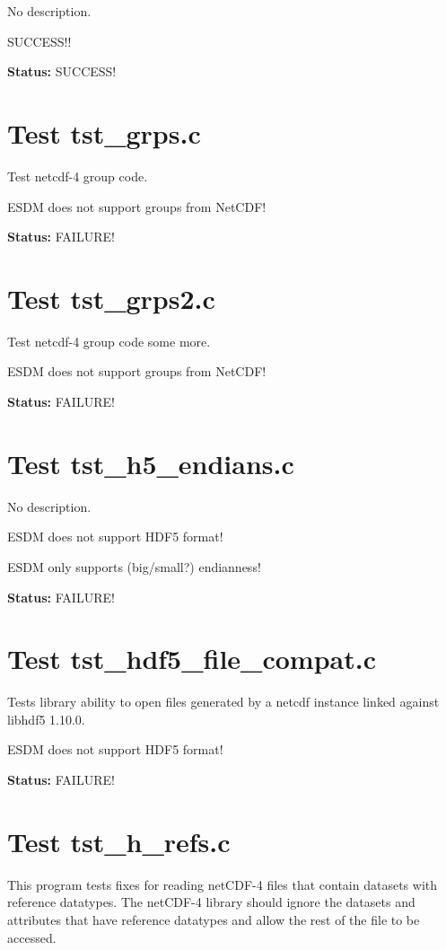 No description.

SUCCESS!!

{\bf \large Status: } SUCCESS!

\section{Test tst\_grps.c}

Test netcdf-4 group code.

ESDM does not support groups from NetCDF!

{\bf \large Status: } FAILURE!

\section{Test tst\_grps2.c}

Test netcdf-4 group code some more.

ESDM does not support groups from NetCDF!

{\bf \large Status: } FAILURE!

\section{Test tst\_h5\_endians.c}

No description.

ESDM does not support HDF5 format!

ESDM only supports (big/small?) endianness!

{\bf \large Status: } FAILURE!

\section{Test tst\_hdf5\_file\_compat.c}

Tests library ability to open files generated by a netcdf instance linked against libhdf5 1.10.0.

ESDM does not support HDF5 format!

{\bf \large Status: } FAILURE!

\section{Test tst\_h\_refs.c}

This program tests fixes for reading netCDF-4 files that contain datasets with reference datatypes.  The netCDF-4 library should ignore the datasets and attributes that have reference datatypes and allow the rest of the file to be accessed.


